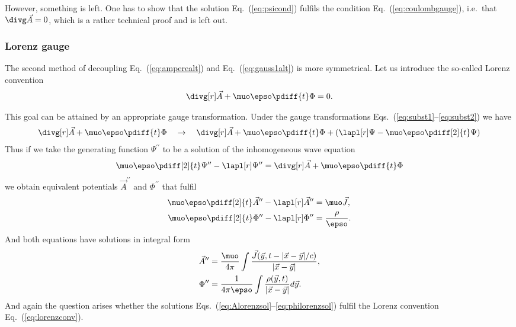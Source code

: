\documentclass[10pt,a4paper]{article}
\newcommand*{\Eq}[1]{Eq.~(#1)}
\newcommand*{\Eqs}[1]{Eqs.~(#1)}
\begin{document}
However, something is left. One has to show that the solution
\Eq{\ref{eq:psicond}} fulfils the condition \Eq{\ref{eq:coulombgauge}}, i.e.\
that $\divg\vec{A} = 0$, which is a rather technical proof and is left out.

\subsubsection{Lorenz gauge}
The second method of decoupling \Eq{\ref{eq:amperealt}} and
\Eq{\ref{eq:gauss1alt}} is more symmetrical. Let us introduce the so-called
Lorenz convention
\begin{align}
\divg[r]\vec{A}+\muo\epso\pdiff{t}\Phi = 0.\label{eq:lorenzconv}
\end{align}

This goal can be attained by an appropriate gauge transformation. Under the
gauge transformations \Eqs{\ref{eq:subst1}--\ref{eq:subst2}} we have
\begin{align}
\divg[r]\vec{A}+\muo\epso\pdiff{t}\Phi \quad\rightarrow\quad
\divg[r]\vec{A}+\muo\epso\pdiff{t}\Phi+
\left(\lapl[r]\Psi - \muo\epso \pdiff[2]{t}\Psi\right)
\end{align}
Thus if we take the generating function $\Psi^{\prime\prime}$ to be a solution
of the inhomogeneous wave equation
\begin{align}
\muo\epso\pdiff[2]{t}\Psi^{\prime\prime}-\lapl[r]\Psi^{\prime\prime}
= \divg[r]\vec{A}+\muo\epso\pdiff{t}\Phi
\end{align}
we obtain equivalent potentials $\vec{A}^{\prime\prime}$ and
$\Phi^{\prime\prime}$ that fulfil
\begin{align}
\muo\epso\pdiff[2]{t}\vec{A}^{\prime\prime}-\lapl[r]\vec{A}^{\prime\prime} 
&= \muo\vec{J},\\
\muo\epso\pdiff[2]{t}\Phi^{\prime\prime}-\lapl[r]\Phi^{\prime\prime}
&= \frac{\rho}{\epso}.
\end{align}
And both equations have solutions in integral form
\begin{align}
\vec{A}^{\prime\prime} &= \frac{\muo}{4\pi} 
\int\frac{\vec{J}(\vec{y},t-|\vec{x}-\vec{y}|/c)}{|\vec{x}-\vec{y}|},
\label{eq:Alorenzsol}\\
\Phi^{\prime\prime} &= \frac{1}{4\pi\epso}
\int\frac{\rho(\vec{y},t)}{|\vec{x}-\vec{y}|} d\vec{y}.
\label{eq:philorenzsol}
\end{align}
And again the question arises whether the solutions 
\Eqs{\ref{eq:Alorenzsol}--\ref{eq:philorenzsol}} fulfil the Lorenz
convention \Eq{\ref{eq:lorenzconv}}. 
\end{document}
